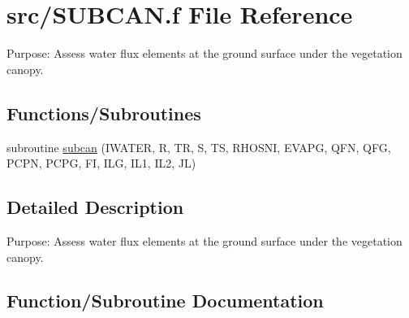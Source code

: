 \hypertarget{SUBCAN_8f}{}\section{src/\+S\+U\+B\+C\+A\+N.f File Reference}
\label{SUBCAN_8f}


Purpose\+: Assess water flux elements at the ground surface under the vegetation canopy.  


\subsection*{Functions/\+Subroutines}
\begin{DoxyCompactItemize}
\item 
subroutine \hyperlink{SUBCAN_8f_a7821b148b27a4db899e0cdf8ece2379a}{subcan} (I\+W\+A\+T\+E\+R, R, T\+R, S, T\+S, R\+H\+O\+S\+N\+I, E\+V\+A\+P\+G, Q\+F\+N, Q\+F\+G, P\+C\+P\+N, P\+C\+P\+G, F\+I, I\+L\+G, I\+L1, I\+L2, J\+L)
\end{DoxyCompactItemize}


\subsection{Detailed Description}
Purpose\+: Assess water flux elements at the ground surface under the vegetation canopy. 



\subsection{Function/\+Subroutine Documentation}
\hypertarget{SUBCAN_8f_a7821b148b27a4db899e0cdf8ece2379a}{}
